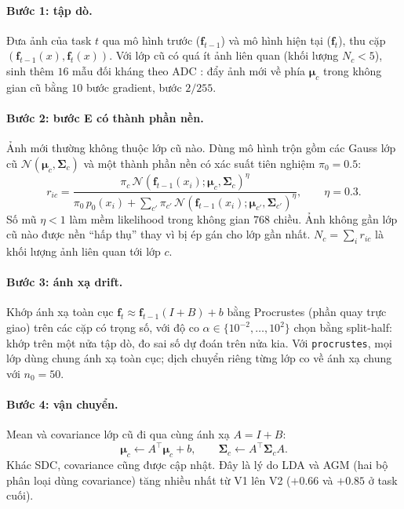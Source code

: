 \documentclass[11pt]{article}
\newcommand{\bmu}{\boldsymbol{\mu}}
\newcommand{\bSigma}{\boldsymbol{\Sigma}}
\newcommand{\vf}{\mathbf{f}}
\begin{document}
\paragraph{Bước 1: tập dò.} Đưa ảnh của task $t$ qua mô hình trước ($\vf_{t-1}$) và mô hình hiện tại ($\vf_t$), thu
cặp $(\vf_{t-1}(x),\vf_t(x))$. Với lớp cũ có quá ít ảnh liên quan (khối lượng $N_c<5$), sinh thêm $16$ mẫu đối kháng
theo ADC \cite{adc}: đẩy ảnh mới về phía $\bmu_c$ trong không gian cũ bằng $10$ bước gradient, bước $2/255$.

\paragraph{Bước 2: bước E có thành phần nền.} Ảnh mới thường không thuộc lớp cũ nào. Dùng mô hình trộn gồm các Gauss
lớp cũ $\mathcal{N}(\bmu_c,\bSigma_c)$ và một thành phần nền có xác suất tiên nghiệm $\pi_0=0.5$:
\begin{equation}
r_{ic}=\frac{\pi_c\,\mathcal{N}(\vf_{t-1}(x_i);\bmu_c,\bSigma_c)^{\eta}}
{\pi_0\,p_0(x_i)+\sum_{c'}\pi_{c'}\,\mathcal{N}(\vf_{t-1}(x_i);\bmu_{c'},\bSigma_{c'})^{\eta}},\qquad \eta=0.3.
\end{equation}
Số mũ $\eta<1$ làm mềm likelihood trong không gian $768$ chiều. Ảnh không gần lớp cũ nào được nền ``hấp thụ'' thay vì bị
ép gán cho lớp gần nhất. $N_c=\sum_i r_{ic}$ là khối lượng ảnh liên quan tới lớp $c$.

\paragraph{Bước 3: ánh xạ drift.} Khớp ánh xạ toàn cục $\vf_t\approx \vf_{t-1}(I+B)+b$ bằng Procrustes \cite{procrustes}
(phần quay trực giao) trên các cặp có trọng số, với độ co $\alpha\in\{10^{-2},\dots,10^{2}\}$ chọn bằng split-half: khớp
trên một nửa tập dò, đo sai số dự đoán trên nửa kia. Với \texttt{procrustes}, mọi lớp dùng chung ánh xạ toàn cục; dịch
chuyển riêng từng lớp co về ánh xạ chung với $n_0=50$.

\paragraph{Bước 4: vận chuyển.} Mean và covariance lớp cũ đi qua cùng ánh xạ $A=I+B$:
\begin{equation}
\bmu_c\leftarrow A^\top\bmu_c+b,\qquad \bSigma_c\leftarrow A^\top\bSigma_c A.
\end{equation}
Khác SDC, covariance cũng được cập nhật. Đây là lý do LDA và AGM (hai bộ phân loại dùng covariance) tăng nhiều nhất từ V1
lên V2 ($+0.66$ và $+0.85$ ở task cuối).
\end{document}
